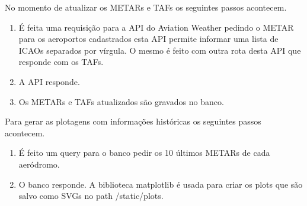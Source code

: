 No momento de atualizar os METARs e TAFs os seguintes passos acontecem.

\begin{enumerate}
\item É feita uma requisição para a API do Aviation Weather pedindo o METAR para os aeroportos
cadastrados esta API permite informar uma lista de ICAOs separados por vírgula.
O mesmo é feito com outra rota desta API que responde com os TAFs.
\item A API responde.
\item Os METARs e TAFs atualizados são gravados no banco.
\end{enumerate}

Para gerar as plotagens com informações históricas os seguintes passos acontecem.
\begin{enumerate}
    \item É feito um query para o banco pedir os 10 últimos METARs de cada aeródromo.
    \item O banco responde. A biblioteca matplotlib é usada para criar os plots que são salvo como SVGs 
    no path /static/plots.
\end{enumerate}